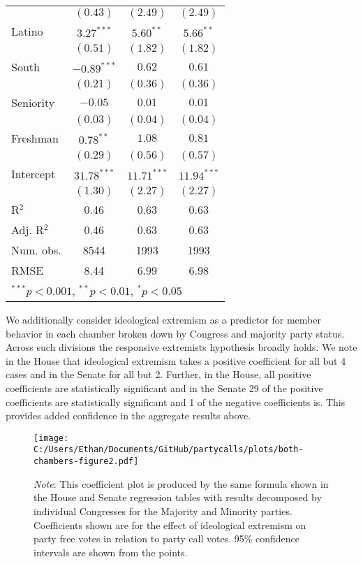 \documentclass[12pt]{article}
\newcommand\fnote[1]{\captionsetup{font=small}\caption*{#1}}
\begin{document}
\begin{table}[H]
\begin{center}
\begin{tabular}{l c c c }
			& $(0.43)$      & $(2.49)$      & $(2.49)$      \\
			Latino                 & $3.27^{***}$  & $5.60^{**}$   & $5.66^{**}$   \\
			& $(0.51)$      & $(1.82)$      & $(1.82)$      \\
			South                  & $-0.89^{***}$ & $0.62$        & $0.61$        \\
			& $(0.21)$      & $(0.36)$      & $(0.36)$      \\
			Seniority              & $-0.05$       & $0.01$        & $0.01$        \\
			& $(0.03)$      & $(0.04)$      & $(0.04)$      \\
			Freshman               & $0.78^{**}$   & $1.08$        & $0.81$        \\
			& $(0.29)$      & $(0.56)$      & $(0.57)$      \\
			Intercept            & $31.78^{***}$ & $11.71^{***}$ & $11.94^{***}$ \\
			& $(1.30)$      & $(2.27)$      & $(2.27)$      \\
			\hline
			R$^2$                  & 0.46          & 0.63          & 0.63          \\
			Adj. R$^2$             & 0.46          & 0.63          & 0.63          \\
			Num. obs.              & 8544          & 1993          & 1993          \\
			RMSE                   & 8.44          & 6.99          & 6.98          \\
			\hline
			\multicolumn{4}{l}{\scriptsize{$^{***}p<0.001$, $^{**}p<0.01$, $^*p<0.05$}}
		\end{tabular}
	\fnote{\textit{}}
	\end{center}
\end{table}

We additionally consider ideological extremism as a predictor for member behavior in each chamber broken down by Congress and majority party status. Across such divisions the responsive extremists hypothesis broadly holds. We note in the House that ideological extremism takes a positive coefficient for all but 4 cases and in the Senate for all but 2. Further, in the House, all positive coefficients are statistically significant and in the Senate 29 of the positive coefficients are statistically significant and 1 of the negative coefficients is. This provides added confidence in the aggregate results above.

\begin{figure}[H]
	\centering
	\caption{Ideology and Responsiveness to Party Calls, Congresses 93-112}
	\texttt{[image: C:/Users/Ethan/Documents/GitHub/partycalls/plots/both-chambers-figure2.pdf]}
	\fnote{\textit{Note}: This coefficient plot is produced by the same formula shown in the House and Senate regression tables with results decomposed by individual Congresses for the Majority and Minority parties. Coefficients shown are for the effect of ideological extremism on party free votes in relation to party call votes. 95\% confidence intervals are shown from the points.}
\end{figure} 
\end{document}
